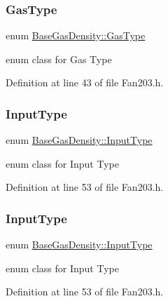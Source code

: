 \subsubsection{\texorpdfstring{Gas\+Type}{GasType}\hspace{0.1cm}{\footnotesize\ttfamily [3/3]}}
{\footnotesize\ttfamily enum \hyperlink{class_base_gas_density_afb215e48f6193462521b7e8d47306ed3}{Base\+Gas\+Density\+::\+Gas\+Type}\hspace{0.3cm}{\ttfamily [strong]}}

enum class for Gas Type 

Definition at line 43 of file Fan203.\+h.

\mbox{\label{class_base_gas_density_a54f846cc4683a49d3904a40fe2986772}} 
\subsubsection{\texorpdfstring{Input\+Type}{InputType}\hspace{0.1cm}{\footnotesize\ttfamily [1/3]}}
{\footnotesize\ttfamily enum \hyperlink{class_base_gas_density_a54f846cc4683a49d3904a40fe2986772}{Base\+Gas\+Density\+::\+Input\+Type}\hspace{0.3cm}{\ttfamily [strong]}}

enum class for Input Type 

Definition at line 53 of file Fan203.\+h.

\mbox{\label{class_base_gas_density_a54f846cc4683a49d3904a40fe2986772}} 
\subsubsection{\texorpdfstring{Input\+Type}{InputType}\hspace{0.1cm}{\footnotesize\ttfamily [2/3]}}
{\footnotesize\ttfamily enum \hyperlink{class_base_gas_density_a54f846cc4683a49d3904a40fe2986772}{Base\+Gas\+Density\+::\+Input\+Type}\hspace{0.3cm}{\ttfamily [strong]}}

enum class for Input Type 

Definition at line 53 of file Fan203.\+h.

